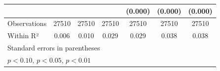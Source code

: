 \begin{table}[ht!]
\begin{tabular}{l*{6}{c}}
            &                     &                     &                     &     (0.000)         &     (0.000)         &     (0.000)         \\
\hline
Observations&       27510         &       27510         &       27510         &       27510         &       27510         &       27510         \\
Within R²   &       0.006         &       0.010         &       0.029         &       0.029         &       0.038         &       0.038         \\
\hline\hline
\multicolumn{7}{l}{\footnotesize Standard errors in parentheses}\\
\multicolumn{7}{l}{\footnotesize \sym{*} \(p<0.10\), \sym{**} \(p<0.05\), \sym{***} \(p<0.01\)}\\
\end{tabular}
\end{table}
